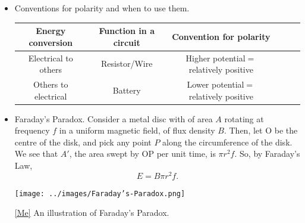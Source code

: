 \documentclass[oneside]{book}
\begin{document}
\begin{itemize}
\begin{center}
\begin{minipage}{0.9\textwidth}
            \captionsetup{type=figure}
            \caption[figure]{\ref{Lenz's Law} Example of motional emf.}
          \end{minipage}
    \end{center}
    \item Conventions for polarity and when to use them.
    \begin{center}
        \begin{tabular}{|Sc|Sc|Sc|}
            \hline
            Energy conversion & Function in a circuit & Convention for polarity\\
            \hline
            \textcolor{NavyBlue!80}{Electrical} to \textcolor{brown!70}{others} & Resistor/Wire & Higher potential\({}={}\)relatively positive\\
            \hline
            \textcolor{brown!70}{Others} to \textcolor{NavyBlue!80}{electrical} & Battery & Lower potential\({}={}\)relatively positive\\
            \hline
        \end{tabular}
    \end{center}
    \item Faraday's Paradox. Consider a metal disc with of area \(A\) rotating at frequency \(f\) in a uniform magnetic field, of flux density \(B\). Then, let \(\text{O}\) be the centre of the disk, and pick any point \(P\) along the circumference of the disk. We see that \(A'\), the area swept by \(\text{OP}\) per unit time, is \(\pi r^2f\). So, by Faraday's Law,
    \[E=B\pi r^2f.\]
    \begin{center}
        \texttt{[image: ../images/Faraday’s-Paradox.png]}
        \captionsetup{type=figure}
        \caption[figure]{\ref{Me} An illustration of Faraday's Paradox.}
    \end{center}
\end{itemize}
\end{document}
